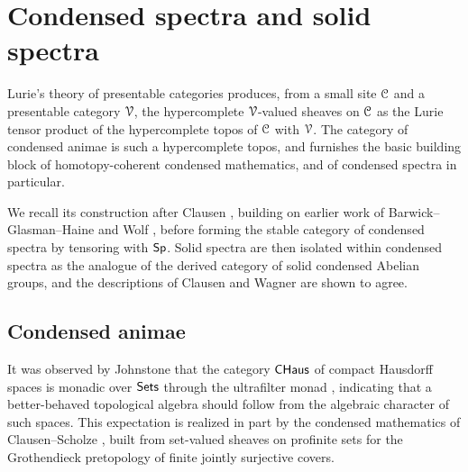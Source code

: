 \section{Condensed spectra and solid spectra}\label{sec: condensed spectra and solid spectra}
Lurie's theory of presentable categories produces, from a small site $\EuScript{C}$ and a presentable category $\EuScript{V}$, the hypercomplete $\EuScript{V}$-valued sheaves on $\EuScript{C}$ as the Lurie tensor product of the hypercomplete topos of $\EuScript{C}$ with $\EuScript{V}$. The category of condensed animae is such a hypercomplete topos, and furnishes the basic building block of homotopy-coherent condensed mathematics, and of condensed spectra in particular.

We recall its construction after Clausen \cite[\S 4]{ClausenLie}, building on earlier work of Barwick--Glasman--Haine \cite[\S 13]{Exodromy} and Wolf \cite{WolfPyknotic}, before forming the stable category of condensed spectra by tensoring with $\mathsf{Sp}$. Solid spectra are then isolated within condensed spectra as the analogue of the derived category of solid condensed Abelian groups, and the descriptions of Clausen \cite[Def. 13.2]{ClausenLie} and Wagner \cite[\S B.6]{WagnerHHab} are shown to agree.
\subsection{Condensed animae}\label{subsec: condensed animae}
It was observed by Johnstone that the category $\mathsf{CHaus}$ of compact Hausdorff spaces is monadic over $\mathsf{Sets}$ through the ultrafilter monad \cite[\S III.2.4]{JohnstoneStone}, indicating that a better-behaved topological algebra should follow from the algebraic character of such spaces. This expectation is realized in part by the condensed mathematics of Clausen--Scholze \cite{Condensed}, built from set-valued sheaves on profinite sets for the Grothendieck pretopology of finite jointly surjective covers. 

